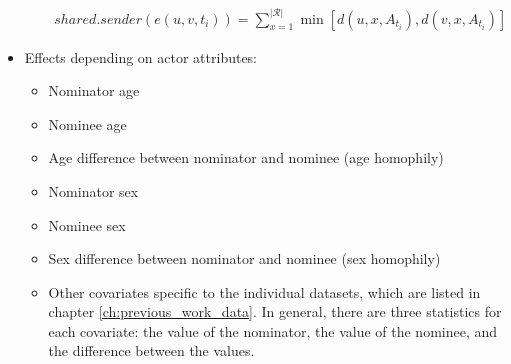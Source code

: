\begin{itemize}
\begin{itemize}
		\begin{align*}
			shared.sender(e(u,v,t_i)) = \sum_{x=1}^{\lvert \mathcal{R} \rvert} \min [d(u,x,A_{t_i}), d(v,x,A_{t_i})]
		\end{align*}
	\end{itemize}
	\item Effects depending on actor attributes:
	\begin{itemize}
		\item Nominator age
		\item Nominee age
		\item Age difference between nominator and nominee (age homophily)
		\item Nominator sex
		\item Nominee sex
		\item Sex difference between nominator and nominee (sex homophily)
		\item Other covariates specific to the individual datasets, which are listed in chapter \ref{ch:previous_work_data}. In general, there are three statistics for each covariate: the value of the nominator, the value of the nominee, and the difference between the values.
	\end{itemize}
\end{itemize}

